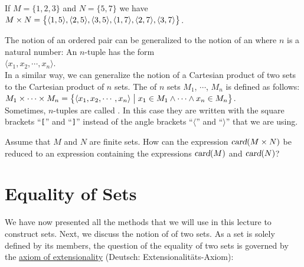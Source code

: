 \exampleEng
If $M = \{ 1, 2, 3 \}$ and $N = \{ 5, 7 \}$ we have
\\[0.2cm]
\hspace*{1.3cm} 
$M \times N = \bigl\{ \pair(1,5),\pair(2,5),\pair(3,5),\pair(1,7),\pair(2,7),\pair(3,7)\bigr\}$.
\eox
\vspace*{0.2cm}

\noindent
The notion of an ordered pair can be generalized to the notion of an
 where $n$ is a natural number: An $n$-tuple has the form
\\[0.2cm]
\hspace*{1.3cm} $\langle x_1, x_2, \cdots, x_n \rangle$. 
\\[0.2cm]
In a similar way, we can generalize the notion of a Cartesian product of two sets to the Cartesian product of
$n$ sets.  The  of $n$ sets  $M_1$, $\cdots$, $M_n$ is defined as follows: \\[0.2cm]
\hspace*{1.3cm}
$M_1 \times \cdots \times M_n =
  \big\{ \langle x_1,x_2,\cdots,x_n \rangle \bigm| x_1\in M_1 \wedge \cdots \wedge x_n \in M_n \big\}
$. 
\\[0.2cm]
Sometimes,  $n$-tuples are called .  In this case they are written with the square brackets ``\texttt{[}''
and ``\texttt{]}'' instead of the angle brackets ``$\langle$'' and ``$\rangle$'' that we are using.  

\exerciseEng
Assume that $M$ and $N$ are finite sets.  How can the expression $\textsl{card}(M \times N)$ be reduced to an
expression containing the expressions $\textsl{card}(M)$ and $\textsl{card}(N)$?
\eox

\section{Equality of Sets}
We have now presented all the methods that we will use in this lecture  to construct sets.
Next, we discuss the notion of  of two sets.  As a set is solely defined by its members,
the question of the equality of two sets is governed by the 
\href{https://en.wikipedia.org/wiki/Axiom_of_extensionality}{axiom of extensionality} (Deutsch:
Extensionalitäts-Axiom):
\vspace*{0.2cm}

\begin{center}     
\colorbox{red}{}
\end{center}
\vspace{0.2cm}

